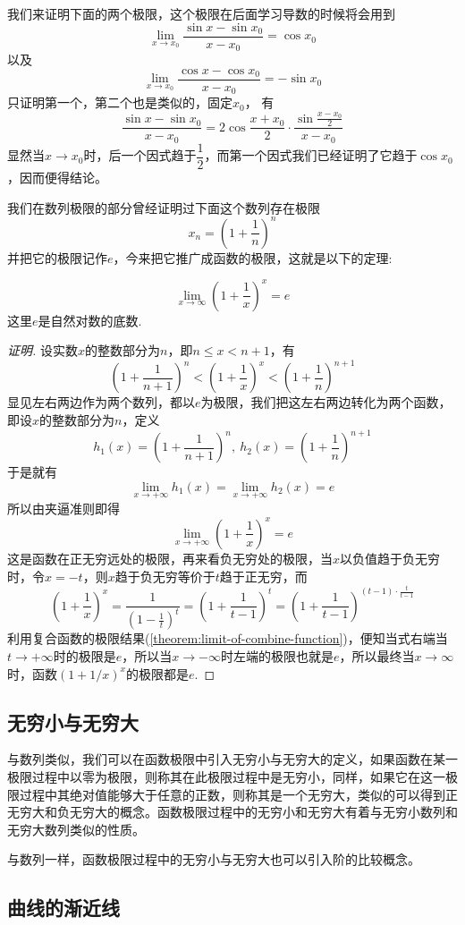 \begin{example}
  \label{example:limit-of-sinx-sinx0-over-x-x0}
  我们来证明下面的两个极限，这个极限在后面学习导数的时候将会用到
  \[ \lim_{x \to x_0} \frac{\sin{x}-\sin{x_0}}{x-x_0} = \cos{x_0} \]
  以及
  \[ \lim_{x \to x_0} \frac{\cos{x}-\cos{x_0}}{x-x_0} = -\sin{x_0} \]
  只证明第一个，第二个也是类似的，固定$x_0$，
  有
  \[ \frac{\sin{x}-\sin{x_0}}{x-x_0} = 2\cos{\frac{x+x_0}{2}} \cdot \frac{\sin{\frac{x-x_0}{2}}}{x-x_0} \]
  显然当$x \to x_0$时，后一个因式趋于$\dfrac{1}{2}$，而第一个因式我们已经证明了它趋于$\cos{x_0}$，因而便得结论。
\end{example}

我们在数列极限的部分曾经证明过下面这个数列存在极限
\[ x_n = \left( 1+\frac{1}{n} \right)^n \]
并把它的极限记作$e$，今来把它推广成函数的极限，这就是以下的定理:
\begin{theorem}
  \[ \lim_{x \to \infty} \left( 1+\frac{1}{x} \right)^x = e \]
  这里$e$是自然对数的底数.
\end{theorem}

\begin{proof}[证明]
  设实数$x$的整数部分为$n$，即$n \leqslant x < n+1$，有
  \[ \left( 1+\frac{1}{n+1} \right)^n < \left( 1+\frac{1}{x} \right)^x < \left( 1+\frac{1}{n} \right)^{n+1} \]
  显见左右两边作为两个数列，都以$e$为极限，我们把这左右两边转化为两个函数，即设$x$的整数部分为$n$，定义
  \[ h_1(x) =  \left( 1+\frac{1}{n+1} \right)^n, \ h_2(x)=\left( 1+\frac{1}{n} \right)^{n+1} \]
  于是就有
  \[ \lim_{x \to +\infty} h_1(x) = \lim_{x \to +\infty} h_2(x) = e \]
  所以由夹逼准则即得
  \[ \lim_{x \to +\infty} \left( 1+\frac{1}{x} \right)^x = e \]
  这是函数在正无穷远处的极限，再来看负无穷处的极限，当$x$以负值趋于负无穷时，令$x=-t$，则$x$趋于负无穷等价于$t$趋于正无穷，而
  \[ \left( 1+\frac{1}{x} \right)^x = \frac{1}{\left( 1-\frac{1}{t} \right)^t} = \left( 1+\frac{1}{t-1} \right)^t = \left( 1+\frac{1}{t-1} \right)^{(t-1) \cdot \frac{t}{t-1}} \]
  利用复合函数的极限结果(\autoref{theorem:limit-of-combine-function})，便知当式右端当$t \to +\infty$时的极限是$e$，所以当$x \to -\infty$时左端的极限也就是$e$，所以最终当$x \to \infty$时，函数$(1+1/x)^x$的极限都是$e$.
\end{proof}


\subsection{无穷小与无穷大}
\label{sec:infinite-small-and-great}

与数列类似，我们可以在函数极限中引入无穷小与无穷大的定义，如果函数在某一极限过程中以零为极限，则称其在此极限过程中是无穷小，同样，如果它在这一极限过程中其绝对值能够大于任意的正数，则称其是一个无穷大，类似的可以得到正无穷大和负无穷大的概念。函数极限过程中的无穷小和无穷大有着与无穷小数列和无穷大数列类似的性质。

与数列一样，函数极限过程中的无穷小与无穷大也可以引入阶的比较概念。

\subsection{曲线的渐近线}
\label{sec:asymptotic-line-of-curve}



